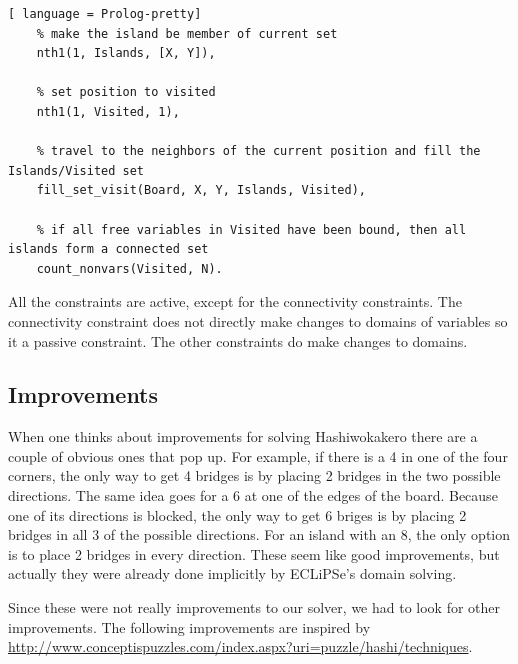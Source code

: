 \documentclass{report}
\begin{document}
\begin{itemize}
\begin{lstlisting}[ language = Prolog-pretty]
    % make the island be member of current set
    nth1(1, Islands, [X, Y]),

    % set position to visited
    nth1(1, Visited, 1),

    % travel to the neighbors of the current position and fill the Islands/Visited set
    fill_set_visit(Board, X, Y, Islands, Visited),

    % if all free variables in Visited have been bound, then all islands form a connected set
    count_nonvars(Visited, N).
\end{lstlisting}

\end{itemize}
All the constraints are active, except for the connectivity constraints. The connectivity constraint does not directly make changes to domains of variables so it a passive constraint. The other constraints do make changes to domains.
\subsection{Improvements}
When one thinks about improvements for solving Hashiwokakero there are a couple of obvious ones that pop up. For example, if there is a 4 in one of the four corners, the only way to get 4 bridges is by placing 2 bridges in the two possible directions. The same idea goes for a 6 at one of the edges of the board. Because one of its directions is blocked, the only way to get 6 briges is by placing 2 bridges in all 3 of the possible directions. For an island with an 8, the only option is to place 2 bridges in every direction. These seem like good improvements, but actually they were already done implicitly by ECLiPSe's domain solving.
\newline

Since these were not really improvements to our solver, we had to look for other improvements. The following improvements are inspired by \url{http://www.conceptispuzzles.com/index.aspx?uri=puzzle/hashi/techniques}.
\end{document}
